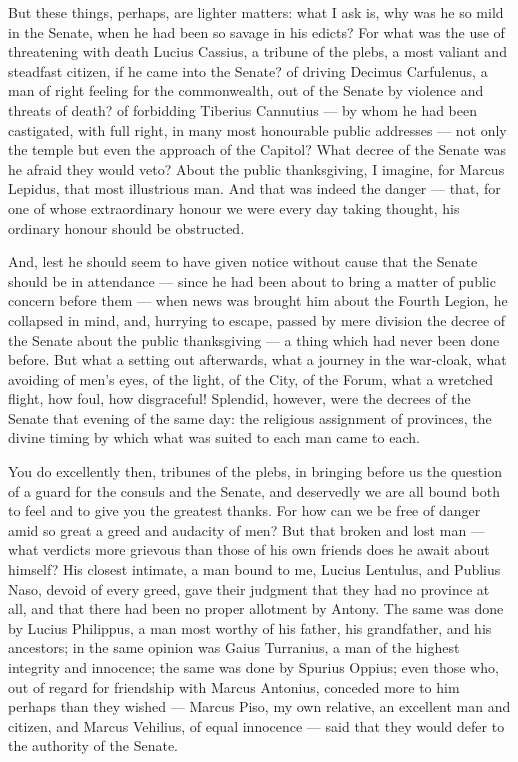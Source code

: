  But these things, perhaps, are lighter matters: what I ask is, why was he so mild in the Senate, when he had been so savage in his edicts? For what was the use of threatening with death Lucius Cassius, a tribune of the plebs, a most valiant and steadfast citizen, if he came into the Senate? of driving Decimus Carfulenus, a man of right feeling for the commonwealth, out of the Senate by violence and threats of death? of forbidding Tiberius Cannutius --- by whom he had been castigated, with full right, in many most honourable public addresses --- not only the temple but even the approach of the Capitol? What decree of the Senate was he afraid they would veto? About the public thanksgiving, I imagine, for Marcus Lepidus, that most illustrious man. And that was indeed the danger --- that, for one of whose extraordinary honour we were every day taking thought, his ordinary honour should be obstructed.

 And, lest he should seem to have given notice without cause that the Senate should be in attendance --- since he had been about to bring a matter of public concern before them --- when news was brought him about the Fourth Legion, he collapsed in mind, and, hurrying to escape, passed by mere division the decree of the Senate about the public thanksgiving --- a thing which had never been done before. But what a setting out afterwards, what a journey in the war-cloak, what avoiding of men's eyes, of the light, of the City, of the Forum, what a wretched flight, how foul, how disgraceful! Splendid, however, were the decrees of the Senate that evening of the same day: the religious assignment of provinces, the divine timing by which what was suited to each man came to each.

 You do excellently then, tribunes of the plebs, in bringing before us the question of a guard for the consuls and the Senate, and deservedly we are all bound both to feel and to give you the greatest thanks. For how can we be free of danger amid so great a greed and audacity of men? But that broken and lost man --- what verdicts more grievous than those of his own friends does he await about himself? His closest intimate, a man bound to me, Lucius Lentulus, and Publius Naso, devoid of every greed, gave their judgment that they had no province at all, and that there had been no proper allotment by Antony. The same was done by Lucius Philippus, a man most worthy of his father, his grandfather, and his ancestors; in the same opinion was Gaius Turranius, a man of the highest integrity and innocence; the same was done by Spurius Oppius; even those who, out of regard for friendship with Marcus Antonius, conceded more to him perhaps than they wished --- Marcus Piso, my own relative, an excellent man and citizen, and Marcus Vehilius, of equal innocence --- said that they would defer to the authority of the Senate.


